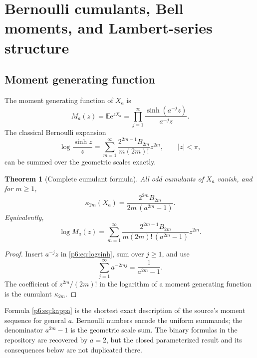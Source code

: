 \documentclass[11pt,oneside]{article}
\numberwithin{equation}{section}
\newtheorem{theorem}{Theorem}[section]
\theoremstyle{definition}
\theoremstyle{remark}
\newcommand{\E}{\mathbb E}
\newcommand{\e}{\mathrm e}
\begin{document}
\section{Bernoulli cumulants, Bell moments, and Lambert-series structure}\label{p6:sec:cumulants}

\subsection{Moment generating function}

The moment generating function of $X_a$ is
\begin{equation}\label{p6:eq:Ma}
 M_a(z)=\E\e^{zX_a}
 =\prod_{j=1}^{\infty}
 \frac{\sinh(a^{-j}z)}{a^{-j}z}.
\end{equation}
The classical Bernoulli expansion
\begin{equation}\label{p6:eq:logsinh}
 \log\frac{\sinh z}{z}
 =\sum_{m=1}^{\infty}
 \frac{2^{2m-1}B_{2m}}{m(2m)!}z^{2m},
 \qquad |z|<\pi,
\end{equation}
can be summed over the geometric scales exactly.

\begin{theorem}[Complete cumulant formula]\label{p6:thm:cumulants}
All odd cumulants of $X_a$ vanish, and for $m\ge1$,
\begin{equation}\label{p6:eq:kappa}
 \kappa_{2m}(X_a)
 =\frac{2^{2m}B_{2m}}{2m\,(a^{2m}-1)}.
\end{equation}
Equivalently,
\begin{equation}\label{p6:eq:logMa}
 \log M_a(z)=
 \sum_{m=1}^{\infty}
 \frac{2^{2m-1}B_{2m}}
 {m(2m)!\,(a^{2m}-1)}z^{2m}.
\end{equation}
\end{theorem}

\begin{proof}
Insert $a^{-j}z$ in \eqref{p6:eq:logsinh}, sum over $j\ge1$, and use
\[
 \sum_{j=1}^{\infty}a^{-2mj}=\frac1{a^{2m}-1}.
\]
The coefficient of $z^{2m}/(2m)!$ in the logarithm of a moment generating
function is the cumulant $\kappa_{2m}$.
\end{proof}

\begin{novelbox}
Formula \eqref{p6:eq:kappa} is the shortest exact description of the source's
moment sequence for general $a$.  Bernoulli numbers encode the uniform summands;
the denominator $a^{2m}-1$ is the geometric scale sum.  The binary formulas in
the repository are recovered by $a=2$, but the closed parameterized result and
its consequences below are not duplicated there.
\end{novelbox}
\end{document}
